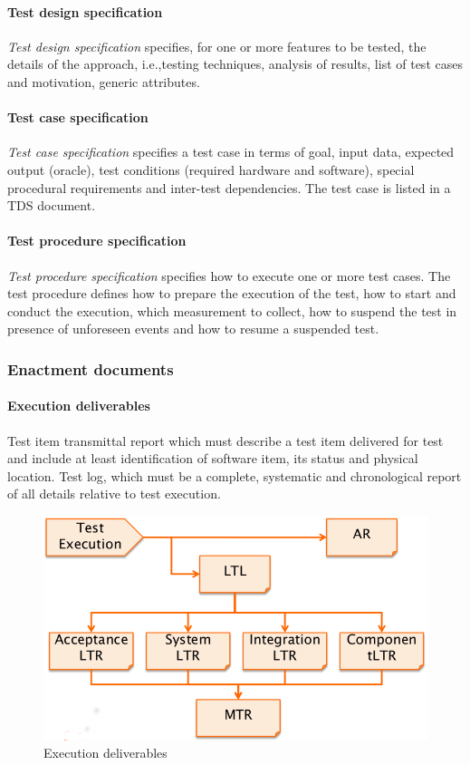 \paragraph{Test design specification}
\emph{Test design specification} specifies, for one or more features to be tested, the details of the approach, i.e.,\@ testing techniques, analysis of results, list of test cases and motivation, generic attributes.

\paragraph{Test case specification}
\emph{Test case specification} specifies a test case in terms of goal, input data, expected output (oracle), test conditions (required hardware and software), special procedural requirements and inter-test dependencies. The test case is listed in a TDS document.

\paragraph{Test procedure specification}
\emph{Test procedure specification} specifies how to execute one or more test cases. The test procedure defines how to prepare the execution of the test, how to start and conduct the execution, which measurement to collect, how to suspend the test in presence of unforeseen events and how to resume a suspended test.

\subsubsection{Enactment documents}
\paragraph{Execution deliverables}
Test item transmittal report which must describe a test item delivered for test and include at least identification of software item, its status and physical location. Test log, which must be a complete, systematic and chronological report of all details relative to test execution.

\begin{figure}[hbtp]
\centering
\includegraphics[scale=0.3]{images/deliverables_execution.png}
\caption{Execution deliverables}
\end{figure}

